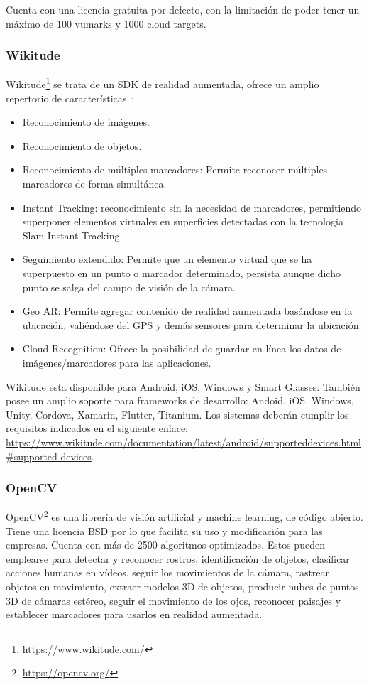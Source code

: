 Cuenta con una licencia gratuita por defecto, con la limitación de poder tener un máximo de 100 vumarks y 1000 cloud targets.



\subsubsection{Wikitude}

Wikitude\footnote{\url{https://www.wikitude.com/}} se trata de un SDK de realidad aumentada, ofrece un amplio repertorio de características~\cite{wikitude}: 

\begin{itemize}
	\item Reconocimiento de imágenes.
	\item Reconocimiento de objetos.
	\item Reconocimiento de múltiples marcadores: Permite reconocer múltiples marcadores de forma simultánea.
	\item Instant Tracking: reconocimiento sin la necesidad de marcadores, permitiendo superponer elementos virtuales en superficies detectadas con la tecnologia Slam Instant Tracking.	
	\item Seguimiento extendido: Permite que un elemento virtual que se ha superpuesto en un punto o marcador determinado, persista aunque dicho punto se salga del campo de visión de la cámara.	
	\item Geo AR: Permite agregar contenido de realidad aumentada basándose en la ubicación, valiéndose del GPS y demás sensores para determinar la ubicación.
	\item Cloud Recognition: Ofrece la posibilidad de guardar en línea los datos de imágenes/marcadores para las aplicaciones.	
\end{itemize}

Wikitude esta disponible para Android, iOS, Windows y Smart Glasses.
También posee un amplio soporte para frameworks de desarrollo: Andoid, iOS, Windows, Unity, Cordova, Xamarin, Flutter, Titanium. 
Los sistemas deberán cumplir los requisitos indicados en el siguiente enlace: \url{https://www.wikitude.com/documentation/latest/android/supporteddevices.html#supported-devices}.



\subsubsection{OpenCV}

OpenCV\footnote{\url{https://opencv.org/}} es una librería de visión artificial y machine learning, de código abierto. Tiene una licencia BSD por lo que facilita su uso y modificación para las empresas. Cuenta con más de 2500 algoritmos optimizados. Estos pueden emplearse para detectar y reconocer rostros, identificación de objetos, clasificar acciones humanas en vídeos, seguir los movimientos de la cámara, rastrear objetos en movimiento, extraer modelos 3D de objetos, producir nubes de puntos 3D de cámaras estéreo, seguir el movimiento de los ojos, reconocer paisajes y establecer marcadores para usarlos en realidad aumentada.

